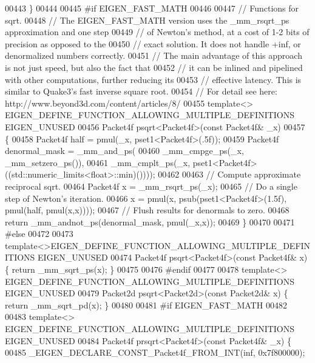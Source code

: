 \begin{DoxyCode}
00443 \}
00444 
00445 \textcolor{preprocessor}{#if EIGEN\_FAST\_MATH}
00446 
00447 \textcolor{comment}{// Functions for sqrt.}
00448 \textcolor{comment}{// The EIGEN\_FAST\_MATH version uses the \_mm\_rsqrt\_ps approximation and one step}
00449 \textcolor{comment}{// of Newton's method, at a cost of 1-2 bits of precision as opposed to the}
00450 \textcolor{comment}{// exact solution. It does not handle +inf, or denormalized numbers correctly.}
00451 \textcolor{comment}{// The main advantage of this approach is not just speed, but also the fact that}
00452 \textcolor{comment}{// it can be inlined and pipelined with other computations, further reducing its}
00453 \textcolor{comment}{// effective latency. This is similar to Quake3's fast inverse square root.}
00454 \textcolor{comment}{// For detail see here: http://www.beyond3d.com/content/articles/8/}
00455 \textcolor{keyword}{template}<> EIGEN\_DEFINE\_FUNCTION\_ALLOWING\_MULTIPLE\_DEFINITIONS EIGEN\_UNUSED
00456 Packet4f psqrt<Packet4f>(\textcolor{keyword}{const} Packet4f& \_x)
00457 \{
00458   Packet4f half = pmul(\_x, pset1<Packet4f>(.5f));
00459   Packet4f denormal\_mask = \_mm\_and\_ps(
00460       \_mm\_cmpge\_ps(\_x, \_mm\_setzero\_ps()),
00461       \_mm\_cmplt\_ps(\_x, pset1<Packet4f>((std::numeric\_limits<float>::min)())));
00462 
00463   \textcolor{comment}{// Compute approximate reciprocal sqrt.}
00464   Packet4f x = \_mm\_rsqrt\_ps(\_x);
00465   \textcolor{comment}{// Do a single step of Newton's iteration.}
00466   x = pmul(x, psub(pset1<Packet4f>(1.5f), pmul(half, pmul(x,x))));
00467   \textcolor{comment}{// Flush results for denormals to zero.}
00468   \textcolor{keywordflow}{return} \_mm\_andnot\_ps(denormal\_mask, pmul(\_x,x));
00469 \}
00470 
00471 \textcolor{preprocessor}{#else}
00472 
00473 \textcolor{keyword}{template}<>EIGEN\_DEFINE\_FUNCTION\_ALLOWING\_MULTIPLE\_DEFINITIONS EIGEN\_UNUSED
00474 Packet4f psqrt<Packet4f>(\textcolor{keyword}{const} Packet4f& x) \{ \textcolor{keywordflow}{return} \_mm\_sqrt\_ps(x); \}
00475 
00476 \textcolor{preprocessor}{#endif}
00477 
00478 \textcolor{keyword}{template}<> EIGEN\_DEFINE\_FUNCTION\_ALLOWING\_MULTIPLE\_DEFINITIONS EIGEN\_UNUSED
00479 Packet2d psqrt<Packet2d>(\textcolor{keyword}{const} Packet2d& x) \{ \textcolor{keywordflow}{return} \_mm\_sqrt\_pd(x); \}
00480 
00481 \textcolor{preprocessor}{#if EIGEN\_FAST\_MATH}
00482 
00483 \textcolor{keyword}{template}<> EIGEN\_DEFINE\_FUNCTION\_ALLOWING\_MULTIPLE\_DEFINITIONS EIGEN\_UNUSED
00484 Packet4f prsqrt<Packet4f>(\textcolor{keyword}{const} Packet4f& \_x) \{
00485   \_EIGEN\_DECLARE\_CONST\_Packet4f\_FROM\_INT(inf, 0x7f800000);

\end{DoxyCode}
